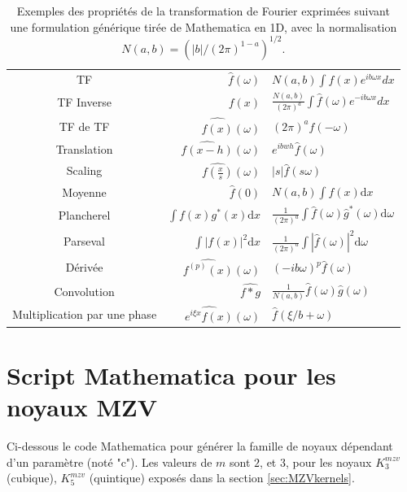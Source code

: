 \documentclass[11pt,twoside]{article}
\begin{document}
\begin{table}
\centering
{\renewcommand{\arraystretch}{2}
\begin{tabular}{cr@{\ =\ }l}
\toprule
TF & $\displaystyle\hat{f}(\omega)$ & $\displaystyle N(a,b)\int f(x) e^{i b \omega x} dx$\\
TF Inverse & $\displaystyle f(x)$ &$\displaystyle \frac{N(a,b)}{(2\pi)^a} \int \hat{f}(\omega) e^{-i b \omega x} dx$\\
TF de TF & $\widehat{\displaystyle \hat{f}(x)}(\omega)$ & $(2\pi)^a f(-\omega)$ \\
Translation & $\displaystyle\widehat{f(x-h)}(\omega)$ & $\displaystyle e^{ibw h}\hat{f}(\omega)$\\
Scaling  & $\displaystyle\widehat{f(\frac{x}{s})}(\omega)$ & $|s|\hat{f}(s\omega)$\\
Moyenne & $\displaystyle \hat{f}(0)$ & $\displaystyle N(a,b)\int f(x) \mathrm{d}x$\\
Plancherel & $\displaystyle \int f(x) g^\ast(x) \mathrm{d}x$ & $\displaystyle \frac{1}{(2\pi)^a} \int \hat{f}(\omega) \hat{g}^\ast(\omega) \mathrm{d}\omega $\\
Parseval & $\displaystyle \int |f(x)|^2 \mathrm{d}x$ & $\displaystyle \frac{1}{(2\pi)^a} \int |\hat{f}(\omega)|^2 \mathrm{d}\omega $\\
Dérivée & $\displaystyle \widehat{f^{(p)}(x)}(\omega)$ & $\displaystyle (-i b\omega)^p \hat{f}(\omega)$\\
Convolution & $\displaystyle \widehat{f\ast g}$ & $\displaystyle \frac{1}{N(a,b)} \hat{f}(\omega) \hat{g}(\omega)$\\
Multiplication par une phase & $\displaystyle \widehat{e^{i\xi x}f(x)}(\omega)$ & $\displaystyle \hat{f}(\xi/b +\omega) $\\
\bottomrule
\end{tabular}
}
\caption{Exemples des propriétés de la transformation de Fourier exprimées suivant une formulation générique tirée de Mathematica en 1D, avec la normalisation $N(a,b)=(|b|/(2\pi)^{1-a})^{1/2}$.}
\label{tag-2020-TFconv}
\end{table} 
%
\newpage
\section{Script Mathematica pour les noyaux MZV}
\label{sec:MathMZV}
Ci-dessous le code Mathematica pour générer la famille de noyaux dépendant d'un paramètre (noté "c"). Les valeurs de $m$ sont $2$, et $3$, pour les noyaux $K^{mzv}_3$ (cubique), $K^{mzv}_5$ (quintique) exposés dans la section \ref{sec:MZVkernels}.
\end{document}
